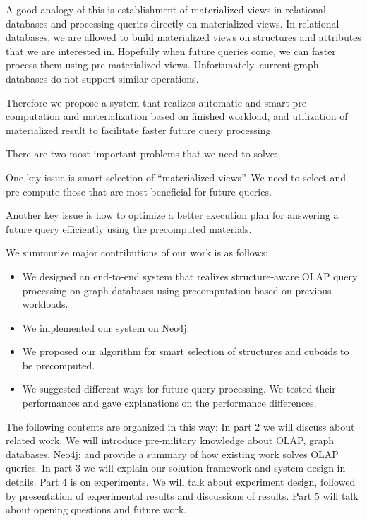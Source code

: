 A good analogy of this is establishment of materialized views in relational databases and processing queries directly on materialized views. In relational databases, we are allowed to build materialized views on structures and attributes that we are interested in. Hopefully when future queries come, we can faster process them using pre-materialized views. Unfortunately, current graph databases do not support similar operations. 
 
Therefore we propose a system that realizes automatic and smart pre computation and materialization based on finished workload, and utilization of materialized result to facilitate faster future query processing. 
 
There are two most important problems that we need to solve: 
 
One key issue is smart selection of ``materialized views''. We need to select and pre-compute those that are most beneficial for future queries. 
 
Another key issue is how to optimize a better execution plan for answering a future query efficiently using the precomputed materials.

We summurize major contributions of our work is as follows:
\begin{itemize}
\item {We designed an end-to-end system that realizes structure-aware OLAP query processing on graph databases using precomputation based on previous workloads.}

\item We implemented our system on Neo4j.

\item We proposed our algorithm for smart selection of structures and cuboids to be precomputed.
 
\item We suggested different ways for future query processing. We tested their performances and gave explanations on the performance differences.
 
 \end{itemize}

The following contents are organized in this way:
In part 2 we will discuss about related work. We will introduce pre-military knowledge about  OLAP, graph databases, Neo4j; and provide a summary of how existing work solves OLAP queries.
In part 3 we will explain our solution framework and system design in details. 
Part 4 is on experiments. We will talk about experiment design, followed by presentation of experimental results and discussions of results.
Part 5 will talk about opening questions and future work.

